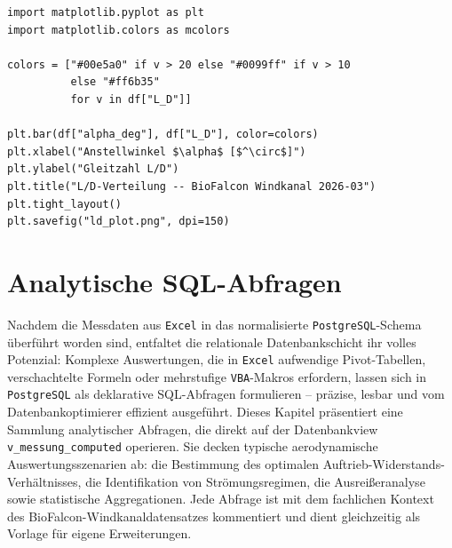 \documentclass[12pt,a4paper]{report}
\theoremstyle{definition}
\theoremstyle{remark}
\newcommand{\excel}{\texttt{Excel}}
\newcommand{\vba}{\texttt{VBA}}
\newcommand{\pg}{\texttt{PostgreSQL}}
\newcommand{\code}[1]{\texttt{#1}}
\begin{document}
\begin{lstlisting}[style=python, caption={Python-\"Aquivalent: matplotlib Farbkodierung}]
import matplotlib.pyplot as plt
import matplotlib.colors as mcolors

colors = ["#00e5a0" if v > 20 else "#0099ff" if v > 10
          else "#ff6b35"
          for v in df["L_D"]]

plt.bar(df["alpha_deg"], df["L_D"], color=colors)
plt.xlabel("Anstellwinkel $\alpha$ [$^\circ$]")
plt.ylabel("Gleitzahl L/D")
plt.title("L/D-Verteilung -- BioFalcon Windkanal 2026-03")
plt.tight_layout()
plt.savefig("ld_plot.png", dpi=150)
\end{lstlisting}

\chapter{Analytische SQL-Abfragen}

Nachdem die Messdaten aus \excel{} in das normalisierte \pg{}-Schema überführt worden sind, entfaltet die relationale Datenbankschicht ihr volles Potenzial: Komplexe Auswertungen, die in \excel{} aufwendige Pivot-Tabellen, verschachtelte Formeln oder mehrstufige \vba{}-Makros erfordern, lassen sich in \pg{} als deklarative SQL-Abfragen formulieren -- präzise, lesbar und vom Datenbankoptimierer effizient ausgeführt. Dieses Kapitel präsentiert eine Sammlung analytischer Abfragen, die direkt auf der Datenbankview \code{v\_messung\_computed} operieren. Sie decken typische aerodynamische Auswertungsszenarien ab: die Bestimmung des optimalen Auftrieb-Widerstands-Verhältnisses, die Identifikation von Strömungsregimen, die Ausreißeranalyse sowie statistische Aggregationen. Jede Abfrage ist mit dem fachlichen Kontext des BioFalcon-Windkanaldatensatzes kommentiert und dient gleichzeitig als Vorlage für eigene Erweiterungen.
\end{document}
